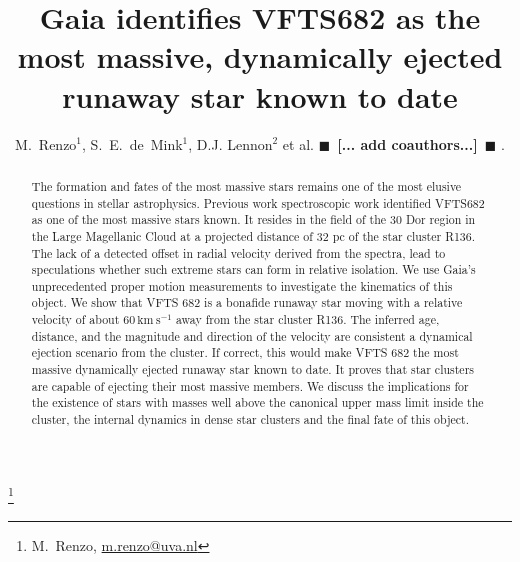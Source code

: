 \documentclass[apjl,twocolumn]{emulateapj}
\newcommand{\todo}[1]{{\large $\blacksquare$~\textbf{\color{red}[#1]}}~$\blacksquare$}
\newcommand{\SdM}[1]{{{\color{Sepia}{#1}}}}
\renewcommand{\SdM}[1]{{{{#1}}}}
\newcommand{\kms}{{\,\mathrm{km\ s^{-1}}}}
\begin{document}
\title{ \SdM{Gaia identifies VFTS682 as the most massive, dynamically ejected runaway star known to date}}

\author{M.~Renzo$^{1}$, S.~E.~de~Mink$^{1}$, \SdM{D.J. Lennon$^{2}$ et al.} \todo{... add coauthors...}%
  .} 

  
\thanks{M.~Renzo, \href{mailto:m.renzo@uva.nl}{m.renzo@uva.nl}}
\date{}
\begin{abstract}
\SdM{ The formation and fates of the most massive stars remains one of the most elusive questions in stellar astrophysics. 
%
Previous work spectroscopic work identified VFTS682 as one of the most massive stars known. It resides in the field of the 30 Dor region in the Large Magellanic Cloud at a projected distance of 32 pc of the star cluster R136. The lack of a detected offset in radial velocity derived from the spectra, lead to speculations whether such extreme stars can form in relative isolation. 
%
We use Gaia's unprecedented proper motion measurements to investigate the kinematics of this object. We show that VFTS 682 is a bonafide runaway star moving with a relative velocity of about $60\kms$ away from the star cluster R136.  The inferred age, distance, and the magnitude and direction of the velocity are consistent a dynamical ejection scenario from the cluster. 
%
If correct, this would make VFTS 682 the most massive dynamically ejected runaway star known to date.  It proves that star clusters are capable of ejecting their most massive members. We discuss the implications for the existence of stars with masses well above the canonical upper mass limit inside the cluster, the internal dynamics in dense star clusters and the final fate of this object. }

\end{abstract}

\maketitle{}
\end{document}

